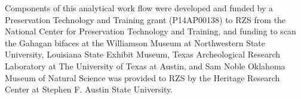 \documentclass[review]{elsarticle}
\begin{document}
Components of this analytical work flow were developed and funded by a Preservation Technology and Training grant (P14AP00138) to RZS from the National Center for Preservation Technology and Training, and funding to scan the Gahagan bifaces at the Williamson Museum at Northwestern State University, Louisiana State Exhibit Museum, Texas Archeological Research Laboratory at The University of Texas at Austin, and Sam Noble Oklahoma Museum of Natural Science was provided to RZS by the Heritage Research Center at Stephen F. Austin State University.


\end{document}
